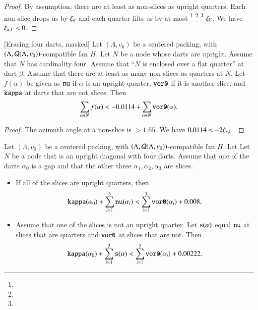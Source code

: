 \begin{proof}
By assumption, there are at least as non-slices as upright quarters. Each
non-slice drops us by $\xi_\kappa$ and each quarter lifts us by at most%
\footnote{} %
\footnote{} %
\footnote{} %
$\xi_\Gamma$. We have $\xi_{\kappa,\Gamma}<0$.
\end{proof}

\begin{lemma}[Erasing four darts, masked]
Let $(\Lambda,v_0)$ be a centered packing, 
with $(\Lambda,{\mathcal Q}(\Lambda,v_0))$-compatible fan $H$.
Let $N$ be a node
whose darts are upright.  Assume that $N$ has cardinality four.
Assume that ``$N$ is enclosed over a flat quarter'' at dart $\beta$.
Assume that there are at least as many non-slices as quarters at $N$.
Let $f(\alpha)$ be given as ${\operatorname{{\texttt{nu}}}}$ if $\alpha$ is an upright
quarter, ${\operatorname{{\texttt{vor0}}}}$ if it is another slice, and
${\operatorname{{\texttt{kappa}}}}$ at darts that are not slices.  Then
  $$
  \sum_{\alpha\in N} f(\alpha) < -0.0114 + 
  \sum_{\alpha\in N} {\operatorname{{\texttt{vor0}}}}(\alpha).
  $$
\end{lemma}

\begin{proof}
The azimuth angle at a non-slice is $>1.65$. 
We have
$0.0114< -2\xi_{\kappa,\Gamma}$.
\end{proof}




\begin{lemma}
    \label{lemma:0.008}
Let $(\Lambda,v_0)$ be a centered packing, 
with $(\Lambda,{\mathcal Q}(\Lambda,v_0))$-compatible fan $H$.
Let
Let $N$ be a node that is an upright diagonal with four darts.  
Assume that one of the darts $\alpha_0$ is a gap and that the other
three $\alpha_1,\alpha_2,\alpha_3$ are slices.  
\begin{itemize}
\item If all of the slices are upright quarters, then
  $$
  {\operatorname{{\texttt{kappa}}}}(\alpha_0) + \sum_{i=1}^3 {\operatorname{{\texttt{nu}}}}(\alpha_i) <
  \sum_{i=1}^3 {\operatorname{{\texttt{vor0}}}}(\alpha_i) + 0.008.
  $$
\item Assume that one of the slices is not an upright quarter.
Let 
${\operatorname{{\texttt{s}}}}(\alpha)$ equal ${\operatorname{{\texttt{nu}}}}$ at slices that
are quarters and ${\operatorname{{\texttt{vor0}}}}$ at slices that are not.
Then
  $$
  {\operatorname{{\texttt{kappa}}}}(\alpha_0) + \sum_{i=1}^3 {\operatorname{{\texttt{s}}}}(\alpha) <
  \sum_{i=1}^3 {\operatorname{{\texttt{vor0}}}}(\alpha_i) + 0.00222.
  $$
\end{itemize}
\end{lemma}


